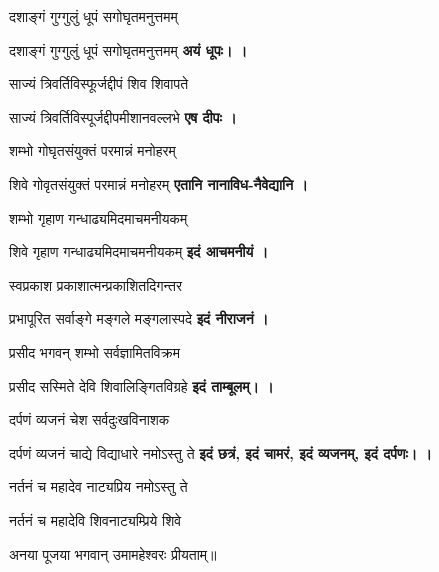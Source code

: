\begin{center}

{दशाङ्गं गुग्गुलुं धूपं सगोघृतमनुत्तमम्}

{दशाङ्गं गुग्गुलुं धूपं सगोघृतमनुत्तमम्}
\textbf{अयं धूपः। \devAya{}।}
\medskip

{साज्यं त्रिवर्तिविस्फूर्जद्दीपं शिव शिवापते}

{साज्यं त्रिवर्तिविस्पूर्जद्दीपमीशानवल्लभे}
\textbf{एष दीपः \devAya{}।}
\medskip

{शम्भो गोघृतसंयुक्तं परमान्नं मनोहरम्}

{शिवे गोवृतसंयुक्तं परमान्नं मनोहरम्}
\textbf{एतानि नानाविध-नैवेद्यानि \devAya{}।}
\medskip

{शम्भो गृहाण गन्धाढ्यमिदमाचमनीयकम्}

{शिवे गृहाण गन्धाढ्यमिदमाचमनीयकम्}
\textbf{इदं आचमनीयं \devAya{}।}
\medskip

{स्वप्रकाश प्रकाशात्मन्प्रकाशितदिगन्तर}

{प्रभापूरित सर्वाङ्गे मङ्गले मङ्गलास्पदे}
\textbf{इदं नीराजनं \devAya{}।}
\medskip

{प्रसीद भगवन् शम्भो सर्वज्ञामितविक्रम}

{प्रसीद सस्मिते देवि शिवालिङ्गितविग्रहे}
\textbf{इदं ताम्बूलम्। \devAya{}।}
\medskip

{दर्पणं व्यजनं चेश सर्वदुःखविनाशक}

{दर्पणं व्यजनं चाद्ये विद्याधारे नमोऽस्तु ते}
\textbf{इदं छत्रं, इदं चामरं, इदं व्यजनम्, इदं दर्पणः। \devAya{}।}
\medskip

{नर्तनं च महादेव नाट्यप्रिय नमोऽस्तु ते}

{नर्तनं च महादेवि शिवनाट्यम्प्रिये शिवे}
\medskip

अनया पूजया भगवान् उमामहेश्वरः प्रीयताम्॥

\end{center}

